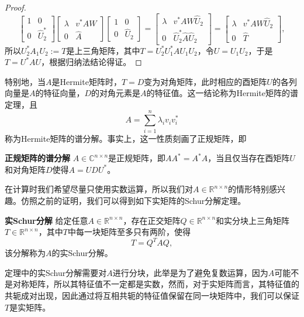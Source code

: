 \documentclass[a4paper,10pt]{ctexart}
\begin{document}
\begin{proof}
\[\begin{bmatrix}
            1 & 0 \\ 0 & \hat{U}_2^*
        \end{bmatrix}
        \begin{bmatrix} 
            \lambda & v^* A W \\
            0 & \hat{A}
        \end{bmatrix}
        \begin{bmatrix} 
            1 & 0 \\ 0 & \hat{U}_2
        \end{bmatrix} = 
        \begin{bmatrix} 
            \lambda & v^* A W \hat{U}_2 \\
            0 & \hat{U}_2^* \hat{A} \hat{U}_2
        \end{bmatrix} = 
        \begin{bmatrix} 
            \lambda & v^* A W \hat{U}_2 \\
            0 & \hat{T}
        \end{bmatrix},
    \]
    所以$ U_2^* A_1 U_2 :=T $是上三角矩阵，其中$ T = U_2^* U_1^* A U_1U_2 $，令$ U = U_1U_2 $，于是$ T = U^* A U $，根据归纳法结论得证。
\end{proof}

特别地，当$ A $是Hermite矩阵时，$ T=D $变为对角矩阵，此时相应的酉矩阵$ U $的各列向量是$ A $的特征向量，$ D $的对角元素是$ A $的特征值。这一结论称为Hermite矩阵的谱定理，且
\begin{equation}
    A = \sum_{i=1}^{n} \lambda_i v_i v_i^*
\end{equation}
称为Hermite矩阵的谱分解。事实上，这一性质刻画了正规矩阵，即
\begin{theorem}{\normalfont\bf{正规矩阵的谱分解}}
    $ A\in \mathbb{C}^{n\times n} $是正规矩阵，即$ AA^* = A^*A $，当且仅当存在酉矩阵$ U $和对角矩阵$ D $使得$ A = UDU^* $。
\end{theorem}

在计算时我们希望尽量只使用实数运算，所以我们对$ A\in \mathbb{R}^{n\times n} $的情形特别感兴趣。仿照之前的证明，我们可以得到如下实矩阵的Schur分解定理。
\begin{theorem}{\normalfont\bf{实Schur分解}}
    给定任意$ A\in \mathbb{R}^{n\times n} $，存在正交矩阵$ Q\in \mathbb{R}^{n\times n} $和实分块上三角矩阵$ T\in \mathbb{R}^{n\times n} $，其中$ T $中每一块矩阵至多只有两阶，使得
    \begin{equation}
        T = Q^T A Q,
    \end{equation}
    该分解称为$ A $的实Schur分解。
\end{theorem}
\noindent 定理中的实Schur分解需要对$ A $进行分块，此举是为了避免复数运算，因为$ A $可能不是对称矩阵，所以其特征值不一定都是实数，然而，对于实矩阵而言，其特征值的共轭成对出现，因此通过将互相共轭的特征值保留在同一块矩阵中，我们可以保证$ T $是实矩阵。
\end{document}
